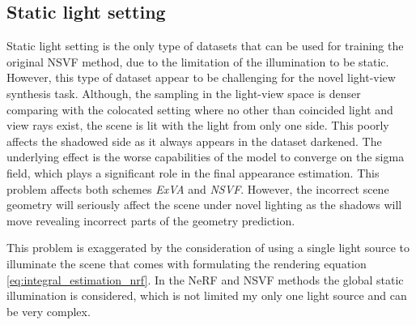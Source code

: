 

% 










\subsection{Static light setting}

Static light setting is the only type of datasets that can be used
for training the original NSVF method,
due to the limitation of the illumination to be static.
However, this type of dataset appear to be challenging for the novel light-view synthesis task.
Although, the sampling in the light-view space is denser comparing with the colocated setting
where no other than coincided light and view rays exist,
the scene is lit with the light from only one side.
This poorly affects the shadowed side as it always appears in the dataset darkened.
The underlying effect is the worse capabilities of the model to converge on the sigma field,
which plays a significant role in the final appearance estimation.
This problem affects both schemes \textit{ExVA} and \textit{NSVF}.
However, the incorrect scene geometry will seriously affect the scene under novel lighting
as the shadows will move revealing incorrect parts of the geometry prediction.

This problem is exaggerated by the consideration of using a single light source to illuminate the scene
that comes with formulating the rendering equation \cref{eq:integral_estimation_nrf}.
In the NeRF and NSVF methods the global static illumination is considered,
which is not limited my only one light source and can be very complex.



